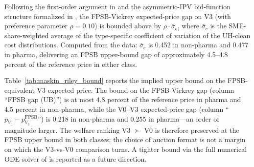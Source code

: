 Following the first-order argument in \citet{maskinriley2000} and the asymmetric-IPV bid-function structure formalized in \citet{lebrun1999}, the FPSB-Vickrey expected-price gap on V3 (with preference parameter $\rho = 0.10$) is bounded above by $\rho \cdot \bar\sigma_c$, where $\bar\sigma_c$ is the SME-share-weighted average of the type-specific coefficient of variation of the UH-clean cost distributions. Computed from the data: $\bar\sigma_c$ is 0.452 in non-pharma and 0.477 in pharma, delivering an FPSB upper-bound gap of approximately 4.5--4.8 percent of the reference price in either class.



Table~\ref{tab:maskin_riley_bound} reports the implied upper bound on the FPSB-equivalent V3 expected price. The bound on the FPSB-Vickrey gap (column ``FPSB gap (UB)'') is at most 4.8 percent of the reference price in pharma and 4.5 percent in non-pharma, while the V0--V3 expected-price gap (column ``$p_{V_0} - p_{V_3}^{\text{FPSB}}$'') is 0.218 in non-pharma and 0.255 in pharma---an order of magnitude larger. The welfare ranking V3 $\succ$ V0 is therefore preserved at the FPSB upper bound in both classes; the choice of auction format is not a margin on which the V3-vs-V0 comparison turns. A tighter bound via the full numerical ODE solver of \citet{lebrun1999} is reported as a future direction.
